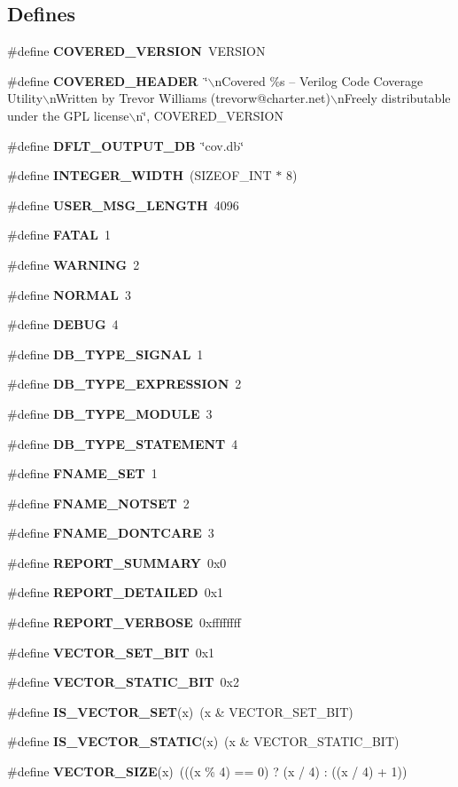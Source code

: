 \subsection*{Defines}
\begin{CompactItemize}
\item 
\#define {\bf COVERED\_\-VERSION}\ VERSION
\item 
\#define {\bf COVERED\_\-HEADER}\ \char`\"{}$\backslash$n\-Covered \%s -- Verilog Code Coverage Utility$\backslash$n\-Written by Trevor Williams  (trevorw@charter.net)$\backslash$n\-Freely distributable under the GPL license$\backslash$n\char`\"{}, COVERED\_\-VERSION
\item 
\#define {\bf DFLT\_\-OUTPUT\_\-DB}\ \char`\"{}cov.db\char`\"{}
\item 
\#define {\bf INTEGER\_\-WIDTH}\ (SIZEOF\_\-INT $\ast$ 8)
\item 
\#define {\bf USER\_\-MSG\_\-LENGTH}\ 4096
\item 
\#define {\bf FATAL}\ 1
\item 
\#define {\bf WARNING}\ 2
\item 
\#define {\bf NORMAL}\ 3
\item 
\#define {\bf DEBUG}\ 4
\item 
\#define {\bf DB\_\-TYPE\_\-SIGNAL}\ 1
\item 
\#define {\bf DB\_\-TYPE\_\-EXPRESSION}\ 2
\item 
\#define {\bf DB\_\-TYPE\_\-MODULE}\ 3
\item 
\#define {\bf DB\_\-TYPE\_\-STATEMENT}\ 4
\item 
\#define {\bf FNAME\_\-SET}\ 1
\item 
\#define {\bf FNAME\_\-NOTSET}\ 2
\item 
\#define {\bf FNAME\_\-DONTCARE}\ 3
\item 
\#define {\bf REPORT\_\-SUMMARY}\ 0x0
\item 
\#define {\bf REPORT\_\-DETAILED}\ 0x1
\item 
\#define {\bf REPORT\_\-VERBOSE}\ 0xffffffff
\item 
\#define {\bf VECTOR\_\-SET\_\-BIT}\ 0x1
\item 
\#define {\bf VECTOR\_\-STATIC\_\-BIT}\ 0x2
\item 
\#define {\bf IS\_\-VECTOR\_\-SET}(x)\ (x \& VECTOR\_\-SET\_\-BIT)
\item 
\#define {\bf IS\_\-VECTOR\_\-STATIC}(x)\ (x \& VECTOR\_\-STATIC\_\-BIT)
\item 
\#define {\bf VECTOR\_\-SIZE}(x)\ (((x \% 4) == 0) ? (x / 4) : ((x / 4) + 1))

\end{CompactItemize}
